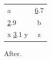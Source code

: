 \documentclass{article}
\begin{document}
\begin{tabular}{|lc|}
a & {\ul 6.7} \\
\multicolumn{1}{|l|}{\ul 2.9} & b \\
\multicolumn{1}{|l|}{x \ul 3.1 y} & z \\
\end{tabular}
After.
\end{document}
